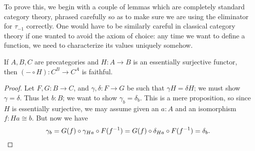 \documentclass{amsart}
\newcommand{\truncf}[1]{\tau_{#1}}
\theoremstyle{definition}
\theoremstyle{remark}
\numberwithin{equation}{section}
\newcommand{\inv}[1]{{#1}^{-1}}
\begin{document}
To prove this, we begin with a couple of lemmas which are completely standard category theory, phrased carefully so as to make sure we are using the eliminator for $\truncf{-1}$ correctly.
One would have to be similarly careful in classical category theory if one wanted to avoid the axiom of choice: any time we want to define a function, we need to characterize its values uniquely somehow.

\begin{lem}\label{lem:precomp-faithful}
  If $A,B,C$ are precategories and $H:A\to B$ is an essentially surjective functor, then $(-\circ H):C^B \to C^A$ is faithful.
\end{lem}
\begin{proof}
  Let $F,G:B\to C$, and $\gamma,\delta:F\to G$ be such that $\gamma H = \delta H$; we must show $\gamma=\delta$.
  Thus let $b:B$; we want to show $\gamma_b=\delta_b$.
  This is a mere proposition, so since $H$ is essentially surjective, we may assume given an $a:A$ and an isomorphism $f:Ha\cong b$.
  But now we have
  \[ \gamma_b = G(f) \circ \gamma_{Ha} \circ F(\inv{f}) 
  = G(f) \circ \delta_{Ha} \circ F(\inv{f})
  = \delta_b.\qedhere
  \]
\end{proof}
\end{document}
